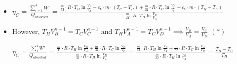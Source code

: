 \documentclass[t,aspectratio=169]{beamer}
\begin{document}
\begin{frame}
\begin{itemize}
\begin{columns}
\begin{column}{0.4\textwidth}
\begin{center}
\end{center}
\end{column}
\begin{column}{0.6\textwidth}
\begin{enumerate}
\item Isothermal: $W'_1 = Q_1 = \frac{m}{M} \cdot R \cdot T_H \ln \frac{V_B}{V_A}$
\item Adiabatic: $W'_2 = -c_V \cdot m \cdot (T_C - T_H) \quad Q = 0$
\item Isothermal: $W'_3 = Q_2 = \frac{m}{M} \cdot R \cdot T_C \ln \frac{V_D}{V_C}$
\item Adiabatic: $W'_4 = -c_V \cdot m \cdot (T_H - T_C) \quad Q = 0$
\end{enumerate}
$Q_1$ is absorbed heat, $Q_2$ is released heat, $T_{H}$ is the higher temperature, and $T_{C}$ is lower temperature. 
\end{column}
\end{columns}


\pagebreak
\item  $\eta_C = \frac{\sum_{i=1}^4 W'}{Q_{absorbed}} = \frac{\frac{m}{M} \cdot R \cdot T_H \ln \frac{V_B}{V_A} - c_V \cdot m \cdot (T_C - T_H) + \frac{m}{M} \cdot R \cdot T_C \ln \frac{V_D}{V_C} - c_V \cdot m \cdot (T_H - T_C)}{\frac{m}{M} \cdot R \cdot T_H \ln \frac{V_B}{V_A}}$ \

\item However, $T_H V_B^{\kappa-1} = T_C V_C^{\kappa-1}$ and $T_H V_A^{\kappa-1} = T_C V_D^{\kappa-1} \implies \frac{V_B}{V_A} = \frac{V_C}{V_D}$ $(*)$

$\eta_C = \frac{\sum_{1}^4 W'}{Q_{absorbed}} = \frac{\frac{m}{M} \cdot R \cdot T_H \ln \frac{V_B}{V_A} + \frac{m}{M} \cdot R \cdot T_C \ln \frac{V_D}{V_C}}{\frac{m}{M} \cdot R \cdot T_H \ln \frac{V_B}{V_A}} = \frac{\frac{m}{M} \cdot R \cdot T_H \ln \frac{V_B}{V_A} + \frac{m}{M} \cdot R \cdot T_C \ln \frac{V_A}{V_B}}{\frac{m}{M} \cdot R \cdot T_H \ln \frac{V_B}{V_A}} = \frac{T_H - T_C}{T_H}$


\end{itemize}
\end{frame}
\end{document}
